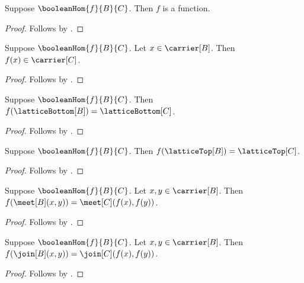 \begin{proposition}\label{boolean_hom_is_function}
    Suppose $\booleanHom{f}{B}{C}$.
    Then $f$ is a function.
\end{proposition}
\begin{proof}
    Follows by .
\end{proof}

\begin{proposition}\label{boolean_hom_apply_type}
    Suppose $\booleanHom{f}{B}{C}$.
    Let $x\in\carrier[B]$.
    Then $f(x)\in\carrier[C]$.
\end{proposition}
\begin{proof}
    Follows by .
\end{proof}

\begin{proposition}\label{boolean_hom_bottom}
    Suppose $\booleanHom{f}{B}{C}$.
    Then $f(\latticeBottom[B])=\latticeBottom[C]$.
\end{proposition}
\begin{proof}
    Follows by
        .
\end{proof}

\begin{proposition}\label{boolean_hom_top}
    Suppose $\booleanHom{f}{B}{C}$.
    Then $f(\latticeTop[B])=\latticeTop[C]$.
\end{proposition}
\begin{proof}
    Follows by
        .
\end{proof}

\begin{proposition}\label{boolean_hom_meet}
    Suppose $\booleanHom{f}{B}{C}$.
    Let $x,y\in\carrier[B]$.
    Then $f(\meet[B](x,y))=\meet[C](f(x),f(y))$.
\end{proposition}
\begin{proof}
    Follows by
        .
\end{proof}

\begin{proposition}\label{boolean_hom_join}
    Suppose $\booleanHom{f}{B}{C}$.
    Let $x,y\in\carrier[B]$.
    Then $f(\join[B](x,y))=\join[C](f(x),f(y))$.
\end{proposition}
\begin{proof}
    Follows by
        .
\end{proof}

